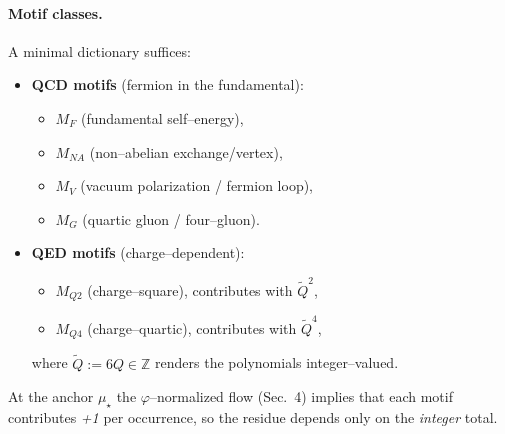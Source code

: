 \documentclass[epjc3]{svjour3}
\begin{document}
\paragraph{Motif classes.}
A minimal dictionary suffices:
\begin{itemize}
  \item \textbf{QCD motifs} (fermion in the fundamental):
    \begin{itemize}
      \item $M_F$ (fundamental self--energy),
      \item $M_{NA}$ (non--abelian exchange/vertex),
      \item $M_V$ (vacuum polarization / fermion loop),
      \item $M_G$ (quartic gluon / four--gluon).
    \end{itemize}
  \item \textbf{QED motifs} (charge--dependent):
    \begin{itemize}
      \item $M_{Q2}$ (charge--square), contributes with $\tilde Q^2$,
      \item $M_{Q4}$ (charge--quartic), contributes with $\tilde Q^4$,
    \end{itemize}
    where $\tilde Q:=6Q\in\mathbb{Z}$ renders the polynomials integer--valued.
  \end{itemize}
At the anchor $\mu_\star$ the $\varphi$--normalized flow (Sec.~4) implies that each motif contributes \emph{+1} per occurrence, so the residue depends only on the \emph{integer} total.
\end{document}
